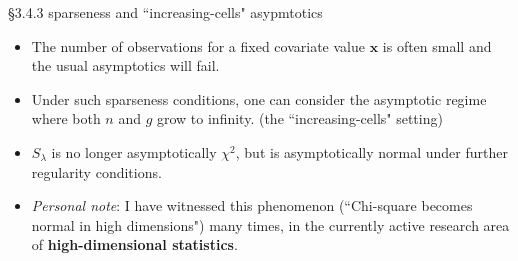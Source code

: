 \documentclass{beamer}
\newenvironment{wideitemize}%
  {\begin{itemize}%
    \setlength{\parskip}{1em}}%
  {\end{itemize}}
\begin{document}
\begin{frame}{\large \S3.4.3 sparseness and ``increasing-cells" asypmtotics}
\begin{wideitemize}
\item
The  number of observations
for a fixed covariate value $\textbf{x}$ is often small and the usual asymptotics will fail.
\item
Under such sparseness conditions, one can consider the asymptotic regime where both $n$ and $g$ grow to infinity.
(the ``increasing-cells" setting)
\item
$S_\lambda$ is no longer asymptotically $\chi^2$, but is  asymptotically
normal  under further regularity conditions. 

\item \emph{Personal note}: I have witnessed this phenomenon (``Chi-square becomes normal in high dimensions") many times,   in the currently active research area of {\bf high-dimensional statistics}. 
\end{wideitemize}
\end{frame}
\end{document}
